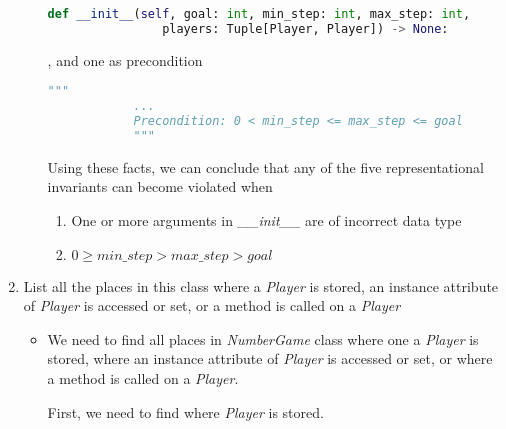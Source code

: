 \documentclass[12pt]{article}
\begin{document}
\begin{enumerate}[1.]
\begin{itemize}
\begin{mdframed}
\begin{mdframed}
            \begin{lstlisting}[language=Python]
            def __init__(self, goal: int, min_step: int, max_step: int,
                players: Tuple[Player, Player]) -> None:
            \end{lstlisting}

            \bigskip

            , and one as precondition

            \bigskip

            \begin{lstlisting}[language=Python]
            """
            ...
            Precondition: 0 < min_step <= max_step <= goal
            """
            \end{lstlisting}

            \bigskip

            Using these facts, we can conclude that any of the five
            representational invariants can become violated when

            \begin{enumerate}[1.]
                \item One or more arguments in \textit{\_\_init\_\_} are of incorrect data type
                \item $0 \geq \textit{min\_step} > \textit{max\_step} > \textit{goal}$
            \end{enumerate}

            \end{mdframed}
        \end{mdframed}

    \end{itemize}

    \item List all the places in this class where a \textit{Player} is stored, an instance
    attribute of \textit{Player} is accessed or set, or a method is called on a \textit{Player}

    \begin{itemize}
        \item  We need to find all places in \textit{NumberGame} class where one a
        \textit{Player} is stored, where an instance attribute of \textit{Player}
        is accessed or set, or where a method is called on a \textit{Player}.

        \bigskip

        First, we need to find where \textit{Player} is stored.


\end{itemize}
\end{enumerate}
\end{document}
